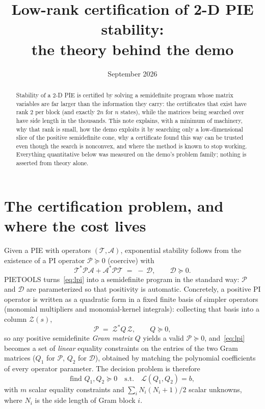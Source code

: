 \documentclass[11pt]{article}
\title{\vspace{-1.5em}Low-rank certification of 2-D PIE stability:\\ the theory behind the demo}
\date{September 2026}
\author{}
\newcommand{\T}{\mathcal{T}}
\newcommand{\A}{\mathcal{A}}
\newcommand{\PP}{\mathcal{P}}
\newcommand{\D}{\mathcal{D}}
\newcommand{\Z}{\mathcal{Z}}
\begin{document}
\maketitle
\vspace{-3em}

\begin{abstract}
\noindent
Stability of a 2-D PIE is certified by solving a semidefinite program whose
matrix variables are far larger than the information they carry: the
certificates that exist have rank $2$ per block (and exactly $2n$ for $n$
states), while the matrices being searched over have side length in the
thousands. This note explains, with a minimum of machinery, why that rank is
small, how the demo exploits it by searching only a low-dimensional slice of
the positive semidefinite cone, why a certificate found this way can be
trusted even though the search is nonconvex, and where the method is known to
stop working. Everything quantitative below was measured on the demo's
problem family; nothing is asserted from theory alone.
\end{abstract}

\section{The certification problem, and where the cost lives}

Given a PIE with operators $(\T,\A)$, exponential stability follows from the
existence of a PI operator $\PP\succeq 0$ (coercive) with
\begin{equation}\label{eq:lpi}
\T^{*}\PP\A+\A^{*}\PP\T \;=\; -\,\D, \qquad \D\succeq 0 .
\end{equation}
PIETOOLS turns~\eqref{eq:lpi} into a semidefinite program in the standard
way: $\PP$ and $\D$ are parameterized so that positivity is automatic.
Concretely, a positive PI operator is written as a quadratic form in a fixed
finite basis of simpler operators (monomial multipliers and monomial-kernel
integrals): collecting that basis into a column $\Z(s)$,
\begin{equation}\label{eq:gram}
\PP \;=\; \Z^{*} Q\, \Z, \qquad Q\succeq 0,
\end{equation}
so any positive semidefinite \emph{Gram matrix} $Q$ yields a valid
$\PP\succeq0$, and~\eqref{eq:lpi} becomes a set of \emph{linear} equality
constraints on the entries of the two Gram matrices ($Q_1$ for $\PP$, $Q_2$
for $\D$), obtained by matching the polynomial coefficients of every operator
parameter. The decision problem is therefore
\begin{equation}\label{eq:sdp}
\text{find } Q_1,Q_2\succeq 0 \quad\text{s.t.}\quad
\mathcal{L}(Q_1,Q_2)=b ,
\end{equation}
with $m$ scalar equality constraints and $\sum_i N_i(N_i+1)/2$ scalar
unknowns, where $N_i$ is the side length of Gram block $i$.
\end{document}
